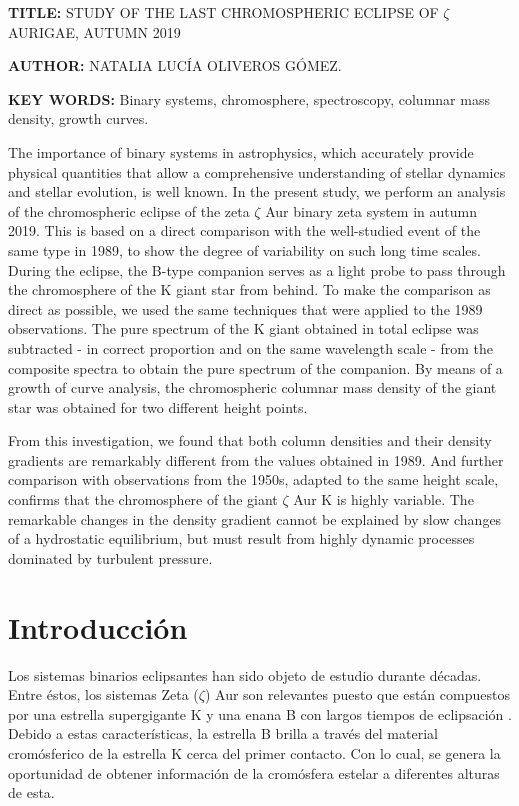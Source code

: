 \documentclass[12pt,oneside,openany,letter]{book}
\begin{document}
{\footnotesize \textbf{TITLE:} STUDY OF THE LAST CHROMOSPHERIC ECLIPSE OF $\zeta$ AURIGAE, AUTUMN 2019

\textbf{AUTHOR:} NATALIA LUCÍA OLIVEROS GÓMEZ.

\textbf{KEY WORDS:} Binary systems, chromosphere, spectroscopy, columnar mass density, growth curves.
\vspace{2mm}

The importance of binary systems in astrophysics, which accurately provide physical quantities that allow a comprehensive understanding of stellar dynamics and stellar evolution, is well known. In the present study, we perform an analysis of the chromospheric eclipse of the zeta $\zeta$ Aur binary zeta system in autumn 2019. This is based on a direct comparison with the well-studied event of the same type in 1989, to show the degree of variability on such long time scales. During the eclipse, the B-type companion serves as a light probe to pass through the chromosphere of the K giant star from behind. To make the comparison as direct as possible, we used the same techniques that were applied to the 1989 observations. The pure spectrum of the K giant obtained in total eclipse was subtracted - in correct proportion and on the same wavelength scale - from the composite spectra to obtain the pure spectrum of the companion. By means of a growth of curve analysis, the chromospheric columnar mass density of the giant star was obtained for two different height points.


From this investigation, we found that both column densities and their density gradients are remarkably different from the values obtained in 1989. And further comparison with observations from the 1950s, adapted to the same height scale, confirms that the chromosphere of the giant $\zeta$ Aur K is highly variable. The remarkable changes in the density gradient cannot be explained by slow changes of a hydrostatic equilibrium, but must result from highly dynamic processes dominated by turbulent pressure.


}



\chapter*{Introducción}\label{cap1}

Los sistemas binarios eclipsantes han sido objeto de estudio durante décadas. Entre éstos, los sistemas Zeta ($\zeta$) Aur son relevantes puesto que están compuestos por una estrella supergigante K y una enana B con largos tiempos de eclipsación \citep{ake2015giants}. Debido a estas características, la estrella B brilla a través del material cromósferico de la estrella K cerca del primer contacto. Con lo cual, se genera la oportunidad de obtener información de la cromósfera estelar a diferentes alturas de esta. 
\end{document}

